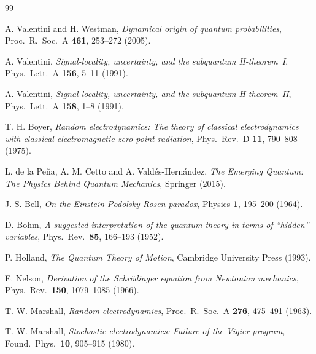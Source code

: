 \documentclass[11pt,a4paper]{article}
\begin{document}
\begin{thebibliography}{99}

A. Valentini and H. Westman,
\emph{Dynamical origin of quantum probabilities},
Proc.\ R.\ Soc.\ A \textbf{461}, 253--272 (2005).

A. Valentini,
\emph{Signal-locality, uncertainty, and the subquantum H-theorem~I},
Phys.\ Lett.\ A \textbf{156}, 5--11 (1991).

A. Valentini,
\emph{Signal-locality, uncertainty, and the subquantum H-theorem~II},
Phys.\ Lett.\ A \textbf{158}, 1--8 (1991).

T. H. Boyer,
\emph{Random electrodynamics: The theory of classical electrodynamics
with classical electromagnetic zero-point radiation},
Phys.\ Rev.\ D \textbf{11}, 790--808 (1975).

L. de la Peña, A. M. Cetto and A. Valdés-Hernández,
\emph{The Emerging Quantum: The Physics Behind Quantum Mechanics},
Springer (2015).

J. S. Bell,
\emph{On the Einstein Podolsky Rosen paradox},
Physics \textbf{1}, 195--200 (1964).

D. Bohm,
\emph{A suggested interpretation of the quantum theory in terms of
``hidden'' variables},
Phys.\ Rev.\ \textbf{85}, 166--193 (1952).

P. Holland,
\emph{The Quantum Theory of Motion},
Cambridge University Press (1993).

E. Nelson,
\emph{Derivation of the Schrödinger equation from Newtonian mechanics},
Phys.\ Rev.\ \textbf{150}, 1079--1085 (1966).

T. W. Marshall,
\emph{Random electrodynamics},
Proc.\ R.\ Soc.\ A \textbf{276}, 475--491 (1963).

T. W. Marshall,
\emph{Stochastic electrodynamics: Failure of the Vigier program},
Found.\ Phys.\ \textbf{10}, 905--915 (1980).

\end{thebibliography}
\end{document}
